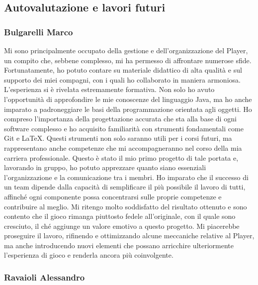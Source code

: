 \documentclass{report}
\begin{document}
\subsection{Autovalutazione e lavori futuri}

\subsubsection{Bulgarelli Marco}
Mi sono principalmente occupato della gestione e dell’organizzazione del Player, un compito che, sebbene complesso, mi ha permesso di affrontare numerose sfide. Fortunatamente, ho potuto contare su materiale didattico di alta qualità e sul supporto dei miei compagni, con i quali ho collaborato in maniera armoniosa. \newline
L’esperienza si è rivelata estremamente formativa. Non solo ho avuto l’opportunità di approfondire le mie conoscenze del linguaggio Java, ma ho anche imparato a padroneggiare le basi della programmazione orientata agli oggetti. Ho compreso l’importanza della progettazione accurata che sta alla base di ogni software complesso 
e ho acquisito familiarità con strumenti fondamentali come Git e LaTeX. Questi strumenti non solo saranno utili per i corsi futuri, ma rappresentano anche competenze che mi accompagneranno nel corso della mia carriera professionale. \newline
Questo è stato il mio primo progetto di tale portata e, lavorando in gruppo, ho potuto apprezzare quanto siano essenziali l’organizzazione e la comunicazione tra i membri. Ho imparato che il successo di un team dipende dalla capacità di semplificare il più possibile il lavoro di tutti, affinché ogni componente possa concentrarsi 
sulle proprie competenze e contribuire al meglio. \newline
Mi ritengo molto soddisfatto del risultato ottenuto e sono contento che il gioco rimanga piuttosto fedele all’originale, con il quale sono cresciuto, il ché aggiunge un valore emotivo a questo progetto. Mi piacerebbe proseguire il lavoro, rifinendo e ottimizzando alcune meccaniche relative al Player, ma anche introducendo nuovi 
elementi che possano arricchire ulteriormente l’esperienza di gioco e renderla ancora più coinvolgente.

\subsubsection{Ravaioli Alessandro}
\end{document}

